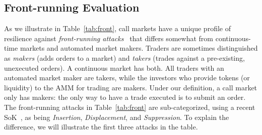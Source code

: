 \subsection{Front-running Evaluation} \label{sec:front}




As we illustrate in Table~\ref{tab:front}, call markets have a unique profile of resilience against \emph{front-running attacks}~\cite{clark2014decentralizing,eskandari2019sok,daian2019flash} that differs somewhat from continuous-time markets and automated market makers. Traders are sometimes distinguished as \emph{makers} (adds orders to a market) and \emph{takers} (trades against a pre-existing, unexecuted orders). A continuous market has both. All traders with an automated market maker are takers, while the investors who provide tokens (or liquidity) to the AMM for trading are makers. Under our definition, a call market only has makers: the only way to have a trade executed is to submit an order. The front-running attacks in Table~\ref{tab:front} are sub-categorized, using a recent SoK~\cite{eskandari2019sok}, as being \emph{Insertion}, \emph{Displacement}, and \emph{Suppression}. To explain the difference, we will illustrate the first three attacks in the table. 

